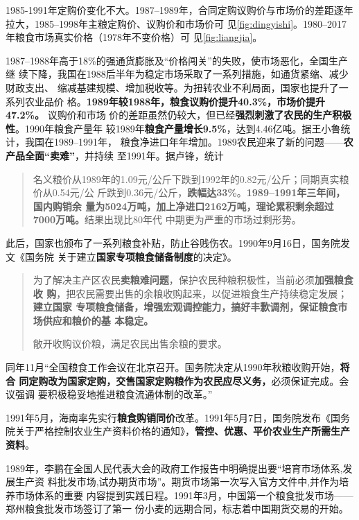 1985-1991年定购价变化不大。1987--1989年，合同定购议购价与市场价的差距逐年
拉大，1985--1998年主粮定购价、议购价和市场价可
见\cref{fig:dingyishi}。1980--2017年粮食市场真实价格（1978年不变价格）可
见\cref{fig:liangjia}。







1987--1988年高于18\%的强通货膨胀及“价格闯关”的失败，使市场恶化，全国生产继
续下降，我国在1988后半年为稳定市场采取了一系列措施，如通货紧缩、减少财政支出、
缩减基建规模、增加税收等。为扭转农业不利局面，国家也提升了一系列农业品价
格。\textbf{1989年较1988年，粮食议购价提升40.3\%，市场价提升47.2\%。} 议购价和市场
价的差距虽然仍较大，但已经\textbf{强烈刺激了农民的生产积极性}。1990年粮食产量年
较1989年\textbf{粮食产量增长9.5\%}，达到4.46亿吨。据王小鲁统计，我国在1989--1991年，
粮食净进口年年增加。1989农民迎来了新的问题——\textbf{农产品全面“卖难”}，并持续
至1991年。据卢锋，统计
\begin{quotation}
  名义粮价从1989年的1.09元/公斤下跌到1992年的0.82元/公斤；同期真实粮价从0.54元/公
  斤跌到0.36元/公斤，\textbf{跌幅达33\%}。\textbf{1989--1991年三年间，国内购销余
    量为5024万吨，加上净进口2162万吨，理论累积剩余超过7000万吨。}结果出现比80年代
  中期更为严重的市场过剩形势。
\end{quotation}

此后，国家也颁布了一系列粮食补贴，防止谷贱伤农。1990年9月16日，国务院发文《国务院
关于建立\textbf{国家专项粮食储备制度}的决定》。
\begin{quotation}
  为了解决主产区农民\textbf{卖粮难问题}，保护农民种粮积极性，当前必须\textbf{加强粮食收
    购}，把农民需要出售的余粮收购起来，以促进粮食生产持续稳定发展；\textbf{建立国家
    专项粮食储备，增强宏观调控能力，搞好丰歉调剂，保证粮食市场供应和粮价的基
    本稳定。}

  敞开收购议价粮，满足农民出售余粮的要求。
\end{quotation}

同年11月“全国粮食工作会议在北京召开。国务院决定从1990年秋粮收购开始，\textbf{将合
  同定购改为国家定购，交售国家定购粮作为农民应尽义务，}必须保证完成。会议强调
要积极稳妥地推进粮食流通体制的改革。”

1991年5月，海南率先实行\textbf{粮食购销同价}改革。1991年5月7日，国务院发布《国务
院关于严格控制农业生产资料价格的通知》，\textbf{管控、优惠、平价农业生产所需生产
  资料}。

1989年，李鹏在全国人民代表大会的政府工作报告中明确提出要“培育市场体系,发展生产资
料批发市场,试办期货市场”。期货市场第一次写入官方文件中,并作为培养市场体系的重要
内容提到实践日程。1991年3月，中国第一个粮食批发市场——郑州粮食批发市场签订了第一
份小麦的远期合同，标志着中国期货交易的开始。\cite{taochangsheng}


